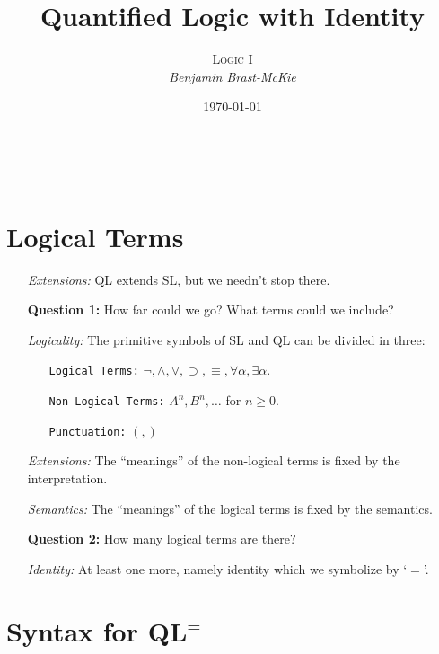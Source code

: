 \documentclass[a4paper, 11pt]{article} %
\title{\textbf{Quantified Logic with Identity}} %
\author{\textsc{Logic I}\\ \em Benjamin Brast-McKie} %
\date{\today} %
\makeatletter
\renewcommand{\maketitle}{ %
\begin{flushright} %
{\LARGE\@title} %

\vspace{10pt} %

{\@author} %
\\\@date %

\vspace{0pt} %
\end{flushright}
}
\makeatother
\begin{document}
\maketitle %

\thispagestyle{empty}


\section*{Logical Terms}

\begin{enumerate}
  \item[\it Extensions:] QL extends SL, but we needn't stop there.
  \item[\bf Question 1:] How far could we go? What terms could we include?
  \item[\it Logicality:] The primitive symbols of SL and QL can be divided in three:
    \begin{itemize}
      \item[\tt Logical Terms:] $\neg,\wedge,\vee,\supset,\equiv,\forall\alpha,\exists\alpha$.
      \item[\tt Non-Logical Terms:] $A^n,B^n,\ldots$ for $n\geq 0$.
      \item[\tt Punctuation:] $(, )$
    \end{itemize}
  \item[\it Extensions:] The ``meanings'' of the non-logical terms is fixed by the interpretation.
  \item[\it Semantics:] The ``meanings'' of the logical terms is fixed by the semantics.
  \item[\bf Question 2:] How many logical terms are there?
  \item[\it Identity:] At least one more, namely identity which we symbolize by `$=$'.
\end{enumerate}





\section*{Syntax for QL$^=$}
\end{document}
